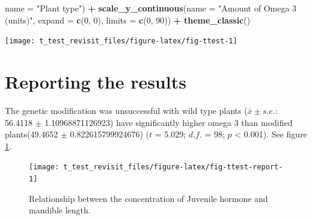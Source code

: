 \documentclass[
]{book}
\newenvironment{Shaded}{\begin{snugshade}}{\end{snugshade}}
\newcommand{\DataTypeTok}[1]{\textcolor[rgb]{0.13,0.29,0.53}{#1}}
\newcommand{\DecValTok}[1]{\textcolor[rgb]{0.00,0.00,0.81}{#1}}
\newcommand{\KeywordTok}[1]{\textcolor[rgb]{0.13,0.29,0.53}{\textbf{#1}}}
\newcommand{\NormalTok}[1]{#1}
\newcommand{\OperatorTok}[1]{\textcolor[rgb]{0.81,0.36,0.00}{\textbf{#1}}}
\newcommand{\StringTok}[1]{\textcolor[rgb]{0.31,0.60,0.02}{#1}}
\begin{document}
\begin{Shaded}
\begin{Highlighting}[]
                   \DataTypeTok{name =} \StringTok{"Plant type"}\NormalTok{) }\OperatorTok{+}
\StringTok{  }\KeywordTok{scale_y_continuous}\NormalTok{(}\DataTypeTok{name =} \StringTok{"Amount of Omega 3 (units)"}\NormalTok{,}
                     \DataTypeTok{expand =} \KeywordTok{c}\NormalTok{(}\DecValTok{0}\NormalTok{, }\DecValTok{0}\NormalTok{),}
                     \DataTypeTok{limits =} \KeywordTok{c}\NormalTok{(}\DecValTok{0}\NormalTok{, }\DecValTok{90}\NormalTok{)) }\OperatorTok{+}
\StringTok{  }\KeywordTok{theme_classic}\NormalTok{()}
\end{Highlighting}
\end{Shaded}

\begin{flushleft}\texttt{[image: t\_test\_revisit\_files/figure-latex/fig-ttest-1]} \end{flushleft}

\hypertarget{reporting-the-results-1}{%
\section{Reporting the results}\label{reporting-the-results-1}}

\begin{Shaded}
\end{Shaded}

The genetic modification was unsuccessful with wild type plants (\(\bar{x} \pm s.e.\): 56.4118 \(\pm\) 1.10968871126923) have significantly higher omega 3 than modified plants(49.4652 \(\pm\) 0.822615799924676) (\(t\) = 5.029; \(d.f.\) = 98; \(p\) \textless{} 0.001). See figure \ref{fig:fig-ttest-report}.



\begin{figure}

\texttt{[image: t\_test\_revisit\_files/figure-latex/fig-ttest-report-1]} \hfill{}

\caption{Relationship between the concentration of Juvenile hormone and mandible length.}\label{fig:fig-ttest-report}
\end{figure}
\end{document}
